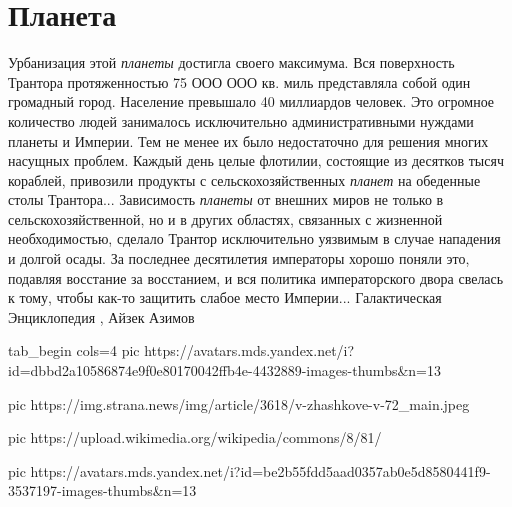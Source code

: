  
 
 
 
 
\chapter{Планета}

Урбанизация этой \emph{планеты} достигла своего максимума. Вся поверхность Трантора
протяженностью 75 ООО ООО кв. миль представляла собой один громадный город.
Население превышало 40 миллиардов человек. Это огромное количество людей
занималось исключительно административными нуждами планеты и Империи. Тем не
менее их было недостаточно для решения многих насущных проблем. Каждый день
целые флотилии, состоящие из десятков тысяч кораблей, привозили продукты с
сельскохозяйственных \emph{планет} на обеденные столы Трантора...
Зависимость \emph{планеты} от внешних миров не только в сельскохозяйственной,
но и в других областях, связанных с жизненной необходимостью, сделало Трантор
исключительно уязвимым в случае нападения и долгой осады. За последнее
десятилетия императоры хорошо поняли это, подавляя восстание за восстанием, и
вся политика императорского двора свелась к тому, чтобы как-то защитить слабое
место Империи... Галактическая Энциклопедия
, Айзек Азимов

\ifcmt
  tab_begin cols=4
		 pic https://avatars.mds.yandex.net/i?id=dbbd2a10586874e9f0e80170042ffb4e-4432889-images-thumbs&n=13

     pic https://img.strana.news/img/article/3618/v-zhashkove-v-72_main.jpeg

     pic https://upload.wikimedia.org/wikipedia/commons/8/81/%

		 pic https://avatars.mds.yandex.net/i?id=be2b55fdd5aad0357ab0e5d8580441f9-3537197-images-thumbs&n=13

